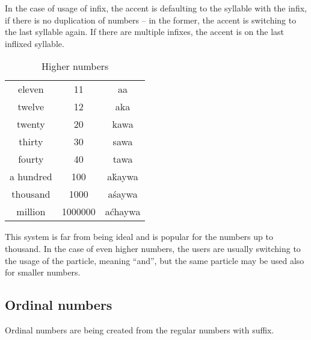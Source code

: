
In the case of usage of  infix, the accent is defaulting to the syllable
with the infix, if there is no duplication of numbers -- in the former, the
accent is switching to the last syllable again. If there are multiple 
infixes, the accent is on the last inflixed syllable.

\begin{table}[ht]
  \centering
  \caption{Higher numbers}
  \begin{tabular}{ccc} \toprule
    eleven    & 11      & aa      \\
    twelve    & 12      & aka     \\
    twenty    & 20      & kawa    \\
    thirty    & 30      & sawa    \\
    fourty    & 40      & tawa    \\
    a hundred & 100     & aḱaywa  \\
    thousand  & 1000    & aśaywa  \\
    million   & 1000000 & aćhaywa \\\bottomrule
  \end{tabular}
  \label{tab:numerals2}
\end{table}

This system is far from being ideal and is popular for the numbers up to
thousand. In the case of even higher numbers, the users are usually switching to
the usage of the  particle, meaning ``and'', but the same particle may be
used also for smaller numbers.




\subsection{Ordinal numbers}

Ordinal numbers are being created from the regular numbers with  suffix.

